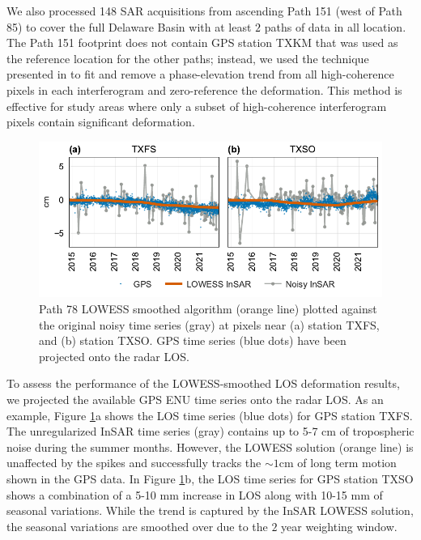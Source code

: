 We also processed 148 SAR acquisitions from ascending Path 151 (west of Path 85) to cover the full Delaware Basin with at least $2$ paths of data in all location.
The Path 151 footprint does not contain GPS station TXKM that was used as the reference location for the other paths;
instead, we used the technique presented in \cite{Zebker2021AccuracyModelFree} to fit and remove a phase-elevation trend from all high-coherence pixels in each interferogram and zero-reference the deformation. This method is effective for study areas where only a subset of high-coherence interferogram pixels contain significant deformation.



\begin{figure}[h]
	\centering
	\includegraphics[width=.99\textwidth]{figures/chapter5-lowess/gps_path78_2plots.pdf}
	\caption[Example results for Path 78 LOWESS smoothing]{
		Path 78 LOWESS smoothed algorithm (orange line) plotted against the original noisy time series (gray) at pixels near (a) station TXFS, and (b) station TXSO.
		GPS time series (blue dots) have been projected onto the radar LOS. 
	}
	\label{fig:ch5-results-gps-example}
\end{figure}

To assess the performance of the LOWESS-smoothed LOS deformation results, we projected the available GPS ENU time series onto the radar LOS. 
As an example, Figure \ref{fig:ch5-results-gps-example}a shows the LOS time series (blue dots) for GPS station TXFS.
The unregularized InSAR time series (gray) contains up to 5-7 cm of tropospheric noise during the summer months. However, the LOWESS solution (orange line) is unaffected by the spikes and successfully tracks the $ \sim1 $cm of long term motion shown in the GPS data. 
In Figure \ref{fig:ch5-results-gps-example}b, the LOS time series for GPS station TXSO shows a combination of a 5-10 mm increase in LOS along with 10-15 mm of seasonal variations.
While the trend is captured by the InSAR LOWESS solution, the seasonal variations are smoothed over due to the $2$ year weighting window.



